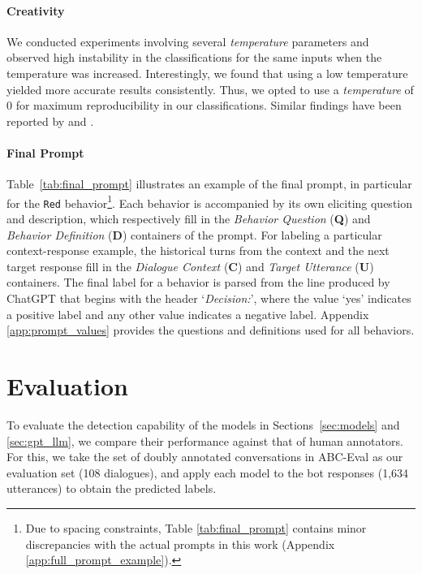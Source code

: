 \paragraph{Creativity}

We conducted experiments involving several \textit{temperature} parameters and observed high instability in the classifications for the same inputs when the temperature was increased. Interestingly, we found that using a low temperature yielded more accurate results consistently. Thus, we opted to use a \textit{temperature} of 0 for maximum reproducibility in our classifications. Similar findings have been reported by \citet{gilardi:23} and \citet{reiss:23}.

\paragraph{Final Prompt}

Table~\ref{tab:final_prompt} illustrates an example of the final prompt, in particular for the \texttt{Red} behavior\footnote{Due to spacing constraints, Table \ref{tab:final_prompt} contains minor discrepancies with the actual prompts in this work (Appendix \ref{app:full_prompt_example}).}. 
Each behavior is accompanied by its own eliciting question and description, which respectively fill in the \textit{Behavior Question} (\textbf{Q}) and \textit{Behavior Definition} (\textbf{D}) containers of the prompt. For labeling a particular context-response example, the historical turns from the context and the next target response fill in the \textit{Dialogue Context} (\textbf{C}) and \textit{Target Utterance} (\textbf{U}) containers. The final label for a behavior is parsed from the line produced by ChatGPT that begins with the header `\textit{Decision:}', where the value `yes' indicates a positive label and any other value indicates a negative label. Appendix \ref{app:prompt_values} provides the questions and definitions used for all behaviors. 

\section{Evaluation}
\label{sec:evaluation_metrics}

To evaluate the detection capability of the models in Sections~\ref{sec:models} and \ref{sec:gpt_llm}, we compare their performance against that of human annotators. For this, we take the set of doubly annotated conversations in ABC-Eval as our evaluation set (108 dialogues), and apply each model to the bot responses (1,634 utterances) to obtain the predicted labels.

